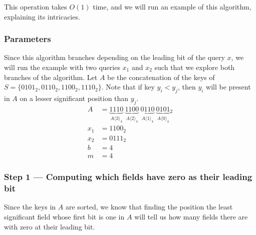 This operation takes $O(1)$ time, and we will run an example of this algorithm, explaining its intricacies.

\subsubsection{Parameters}

Since this algorithm branches depending on the leading bit of the query $x$, we will run the example with two queries $x_1$ and $x_2$ such that we explore both branches of the algorithm. Let $A$ be the concatenation of the keys of $S = \{0101_2, 0110_2, 1100_2, 1110_2 \}$. Note that if key $y_i < y_j$, then $y_i$ will be present in $A$ on a lesser significant position than $y_j$.
\begin{align*}
    A &= \underbrace{1110}_{A\langle 3 \rangle_4}\ \underbrace{1100}_{A\langle 2 \rangle_4}\ \underbrace{0110}_{A\langle 1\rangle_4}\ \underbrace{0101}_{A\langle 0 \rangle_4}{}_2 \\
    x_1 &= 1100_2 \\
    x_2 &= 0111_2 \\
    b &= 4 \\
    m &= 4
\end{align*}

\subsubsection{Step 1 --- Computing which fields have zero as their leading bit} \label{sec:computeM}

Since the keys in $A$ are sorted, we know that finding the position the least significant field whose first bit is one in $A$ will tell us how many fields there are with zero at their leading bit.

